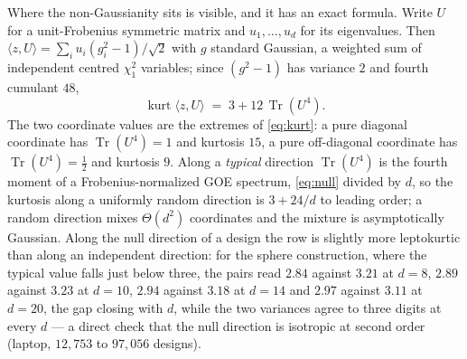 \documentclass[11pt]{article}
\theoremstyle{definition}
\DeclareMathOperator{\Tr}{Tr}
\begin{document}
Where the non-Gaussianity sits is visible, and it has an exact formula. Write $U$ for a unit-Frobenius
symmetric matrix and $u_1,\dots,u_d$ for its eigenvalues. Then $\langle z,U\rangle=\sum_iu_i(g_i^2-1)/\sqrt2$
with $g$ standard Gaussian, a weighted sum of independent centred $\chi^2_1$ variables; since
$(g^2-1)$ has variance $2$ and fourth cumulant $48$,
\begin{equation}\label{eq:kurt}
\operatorname{kurt}\langle z,U\rangle\;=\;3+12\,\Tr(U^4).
\end{equation}
The two coordinate values are the extremes of \eqref{eq:kurt}: a pure diagonal coordinate has
$\Tr(U^4)=1$ and kurtosis $15$, a pure off-diagonal coordinate has $\Tr(U^4)=\tfrac12$ and kurtosis
$9$. Along a \emph{typical} direction $\Tr(U^4)$ is the fourth moment of a Frobenius-normalized GOE
spectrum, \eqref{eq:null} divided by $d$, so the kurtosis along a uniformly random direction is
$3+24/d$ to leading order; a random direction mixes $\Theta(d^2)$ coordinates and the mixture is
asymptotically Gaussian. Along the null direction of a design the row is slightly more leptokurtic
than along an independent direction: for the sphere construction, where the typical value falls just
below three, the pairs read $2.84$ against $3.21$ at $d=8$, $2.89$ against $3.23$ at $d=10$, $2.94$
against $3.18$ at $d=14$ and $2.97$ against $3.11$ at $d=20$, the gap closing with $d$, while the two
variances agree to three digits at every $d$ --- a direct check that the null direction is isotropic
at second order (laptop, $12{,}753$ to $97{,}056$ designs).
\end{document}
